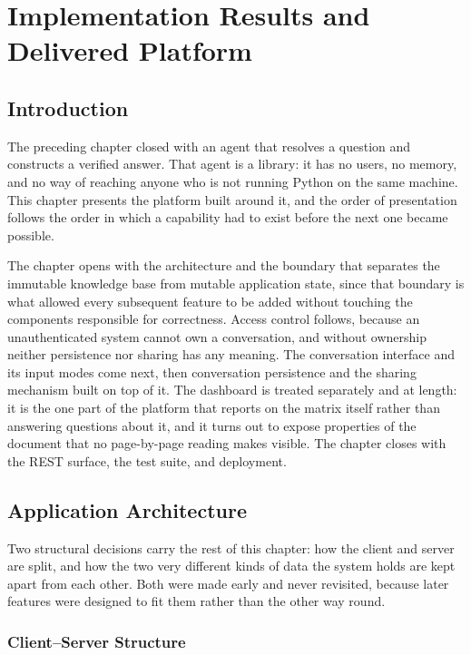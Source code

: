 \chapter{Implementation Results and Delivered Platform}
\label{ch:platform}
\minitoc

\section*{Introduction}

The preceding chapter closed with an agent that resolves a question and constructs a
verified answer. That agent is a library: it has no users, no memory, and no way of
reaching anyone who is not running Python on the same machine. This chapter presents the
platform built around it, and the order of presentation follows the order in which a
capability had to exist before the next one became possible.

The chapter opens with the architecture and the boundary that separates the immutable
knowledge base from mutable application state, since that boundary is what allowed every
subsequent feature to be added without touching the components responsible for
correctness. Access control follows, because an unauthenticated system cannot own a
conversation, and without ownership neither persistence nor sharing has any meaning. The
conversation interface and its input modes come next, then conversation persistence and
the sharing mechanism built on top of it. The dashboard is treated separately and at
length: it is the one part of the platform that reports on the matrix itself rather than
answering questions about it, and it turns out to expose properties of the document that
no page-by-page reading makes visible. The chapter closes with the REST surface, the test
suite, and deployment.

\section{Application Architecture}

Two structural decisions carry the rest of this chapter: how the client and server are
split, and how the two very different kinds of data the system holds are kept apart from
each other. Both were made early and never revisited, because later features were designed
to fit them rather than the other way round.

\subsection{Client--Server Structure}


